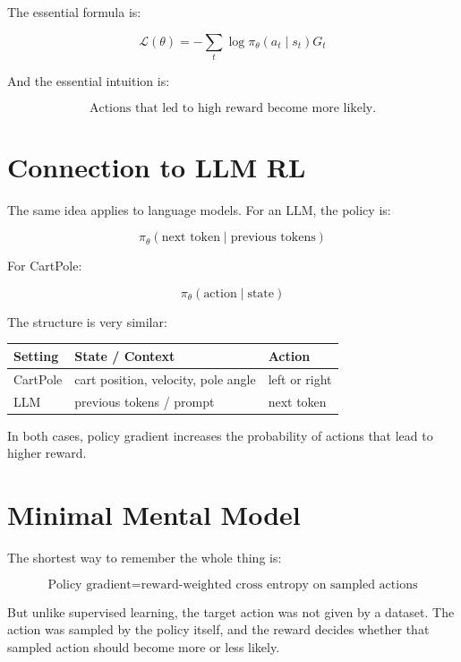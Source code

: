 \documentclass[11pt]{article}
\begin{document}
The essential formula is:

\[
\boxed{
\mathcal{L}(\theta)
= -\sum_t \log \pi_\theta(a_t \mid s_t)G_t
}
\]

And the essential intuition is:

\[
\boxed{
\text{Actions that led to high reward become more likely.}
}
\]

\section{Connection to LLM RL}

The same idea applies to language models.
For an LLM, the policy is:

\[
\pi_\theta(\text{next token} \mid \text{previous tokens})
\]

For CartPole:

\[
\pi_\theta(\text{action} \mid \text{state})
\]

The structure is very similar:

\begin{center}
\begin{tabular}{lll}
\toprule
Setting & State / Context & Action \\
\midrule
CartPole & cart position, velocity, pole angle & left or right \\
LLM & previous tokens / prompt & next token \\
\bottomrule
\end{tabular}
\end{center}

In both cases, policy gradient increases the probability of actions that lead to higher reward.

\section{Minimal Mental Model}

The shortest way to remember the whole thing is:

\[
\boxed{
\text{Policy gradient} = \text{reward-weighted cross entropy on sampled actions}
}
\]

But unlike supervised learning, the target action was not given by a dataset.
The action was sampled by the policy itself, and the reward decides whether that sampled action should become more or less likely.
\end{document}
